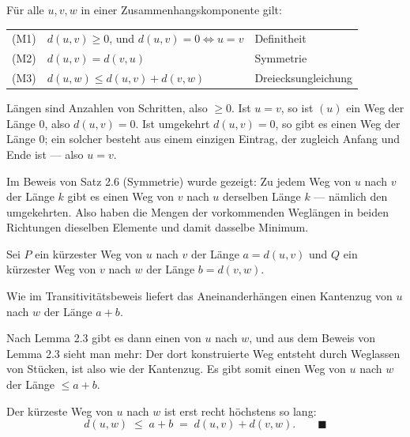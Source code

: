 \begin{merksatz}
Für alle $u,v,w$ in einer Zusammenhangskomponente gilt:
\begin{center}
\renewcommand{\arraystretch}{1.5}
\begin{tabular}{@{}P{1.2cm}P{3.4cm}P{3.8cm}@{}}
\toprule
(M1) & $d(u,v) \ge 0$, und $d(u,v) = 0 \iff u = v$ & Definitheit\\
(M2) & $d(u,v) = d(v,u)$ & Symmetrie\\
(M3) & $d(u,w) \le d(u,v) + d(v,w)$ & Dreiecksungleichung\\
\bottomrule
\end{tabular}
\end{center}
\end{merksatz}

\begin{merksatz}
Längen sind Anzahlen von Schritten, also $\ge 0$. Ist $u = v$, so ist $(u)$ ein Weg der Länge $0$, also $d(u,v) = 0$. Ist umgekehrt $d(u,v) = 0$, so gibt es einen Weg der Länge $0$; ein solcher besteht aus einem einzigen Eintrag, der zugleich Anfang und Ende ist --- also $u = v$.

Im Beweis von Satz 2.6 (Symmetrie) wurde gezeigt: Zu jedem Weg von $u$ nach $v$ der Länge $k$ gibt es einen Weg von $v$ nach $u$ derselben Länge $k$ --- nämlich den umgekehrten. Also haben die Mengen der vorkommenden Weglängen in beiden Richtungen dieselben Elemente und damit dasselbe Minimum.

Sei $P$ ein kürzester Weg von $u$ nach $v$ der Länge $a = d(u,v)$ und $Q$ ein kürzester Weg von $v$ nach $w$ der Länge $b = d(v,w)$.

Wie im Transitivitätsbeweis liefert das Aneinanderhängen einen Kantenzug von $u$ nach $w$ der Länge $a + b$.

Nach Lemma 2.3 gibt es dann einen  von $u$ nach $w$, und aus dem Beweis von Lemma 2.3 sieht man mehr: Der dort konstruierte Weg entsteht durch Weglassen von Stücken, ist also  wie der Kantenzug. Es gibt somit einen Weg von $u$ nach $w$ der Länge $\le a+b$.

Der kürzeste Weg von $u$ nach $w$ ist erst recht höchstens so lang:
\[ d(u,w) \;\le\; a + b \;=\; d(u,v) + d(v,w) . \qquad \blacksquare \]
\end{merksatz}

